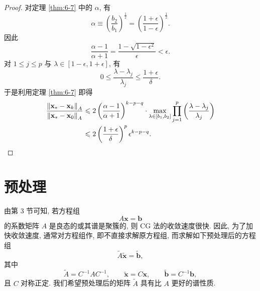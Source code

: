 \begin{proof}
对定理 \ref{thm:6-7} 中的 $\alpha$, 有
\[
  \alpha\equiv\left(\frac{b_2}{b_1}\right)^{\frac{1}{2}}
  =\left(\frac{1+\epsilon}{1-\epsilon}\right)^{\frac{1}{2}}.
\]
因此
\[
  \frac{\alpha-1}{\alpha+1}=\frac{1-\sqrt{1-\epsilon^2}}{\epsilon}<\epsilon.
\]
对 $1\leqslant j\leqslant p$ 与 $\lambda\in[1-\epsilon,1+\epsilon]$, 有
\[
  0\leqslant\frac{\lambda-\lambda_j}{\lambda_j}\leqslant\frac{1+\epsilon}{\delta}.
\]
于是利用定理 \ref{thm:6-7} 即得
\[
  \begin{aligned}
    \frac{\left\|\mathbf{x}_*-\mathbf{x}_k\right\|_A}{\left\|\mathbf{x}_*-\mathbf{x}_0\right\|_A}
    &\leqslant2\left(\frac{\alpha-1}{\alpha+1}\right)^{k-p-q}
      \cdot\max_{\lambda\in[b_1,b_2]}\prod_{j=1}^p
      \left(\frac{\lambda-\lambda_j}{\lambda_j}\right)\\
    &\leqslant2\left(\frac{1+\epsilon}{\delta}\right)^p\epsilon^{k-p-q}.
  \end{aligned}
  \qedhere
\]
\end{proof}

\section{预处理}
\label{sec:6-4}

由第 3 节可知, 若方程组
\[
  A\mathbf{x}=\mathbf{b}
\]
的系数矩阵 $A$ 是良态的或其谱是聚簇的, 则 CG 法的收敛速度很快. 因此, 为了加快收敛速度, 通常对方程组作, 即不直接求解原方程组, 而求解如下预处理后的方程组
\begin{equation}
  \widetilde{A}\tilde{\mathbf{x}}=\tilde{\mathbf{b}},
  \label{eq:6-17}
\end{equation}
其中
\[
  \widetilde{A}=C^{-1}AC^{-1},\qquad
  \tilde{\mathbf{x}}=C\mathbf{x},\qquad
  \tilde{\mathbf{b}}=C^{-1}\mathbf{b},
\]
且 $C$ 对称正定. 我们希望预处理后的矩阵 $\widetilde{A}$ 具有比 $A$ 更好的谱性质.

